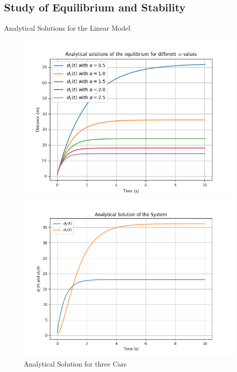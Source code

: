 \documentclass{beamer}
\begin{document}
\subsection{Study of Equilibrium and Stability}
\begin{frame}{Analytical Solutions for the Linear Model}
	\begin{figure}[H]
		\centering
		\begin{minipage}[t]{0.49\linewidth}
			\centering
			\includegraphics[width=\linewidth]{Stability.png}
			\caption{Analytical Solution for two Cars}
			\label{fig:StabilityAnalysis}
		\end{minipage}
		\begin{minipage}[t]{0.49\linewidth}
			\centering
			\includegraphics[width=\linewidth]{AnalyticalSolution.png}
			\caption{Analytical Solution for three Cars}
			\label{fig:AnalyticalSolution}
		\end{minipage}\hfill
		\label{fig:CombinedFigures}
	\end{figure}
\end{frame}
\end{document}
